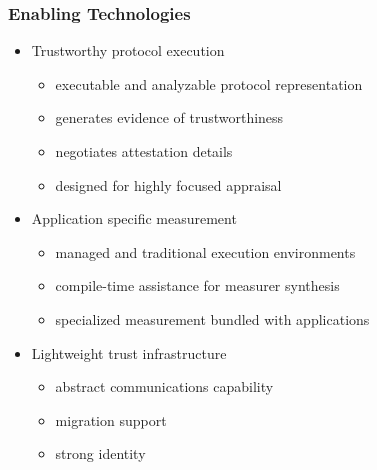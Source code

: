 \documentclass{beamer}
\begin{document}


\begin{frame}
  \frametitle{Enabling Technologies}
  \begin{itemize}
  \item Trustworthy protocol execution
    \begin{itemize}
    \item executable and analyzable protocol representation
    \item generates evidence of trustworthiness
    \item negotiates attestation details
    \item designed for highly focused appraisal
    \end{itemize}
  \item Application specific measurement
    \begin{itemize}
    \item managed and traditional execution environments
    \item compile-time assistance for measurer synthesis
    \item specialized measurement bundled with applications
    \end{itemize}
  \item Lightweight trust infrastructure
    \begin{itemize}
    \item abstract communications capability
    \item migration support
    \item strong identity
    \end{itemize}
  \end{itemize}
\end{frame}
\end{document}
